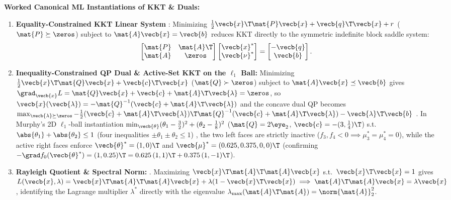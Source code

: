 \documentclass[../../../../master.tex]{subfiles}
\begin{document}
\textbf{Worked Canonical ML Instantiations of KKT \& Duals:}
\begin{enumerate}[leftmargin=1.4em]
  \item \textbf{Equality-Constrained KKT Linear System} : Minimizing $\frac{1}{2}\vecb{x}\T\mat{P}\vecb{x} + \vecb{q}\T\vecb{x} + r$ ($\mat{P} \succeq \zeros$) subject to $\mat{A}\vecb{x} = \vecb{b}$ reduces KKT directly to the symmetric indefinite block saddle system:
  \begin{equation}
    \begin{bmatrix} \mat{P} & \mat{A}\T \\ \mat{A} & \zeros \end{bmatrix}
    \begin{bmatrix} \vecb{x}^* \\ \vecb{\nu}^* \end{bmatrix}
    = \begin{bmatrix} -\vecb{q} \\ \vecb{b} \end{bmatrix}.
    \label{eq:convex:kkt_eq_qp}
  \end{equation}
  \item \textbf{Inequality-Constrained QP Dual \& Active-Set KKT on the $\ell_1$ Ball:} Minimizing $\frac{1}{2}\vecb{x}\T\mat{Q}\vecb{x} + \vecb{c}\T\vecb{x}$ ($\mat{Q} \succ \zeros$) subject to $\mat{A}\vecb{x} \preceq \vecb{b}$ gives $\grad_{\vecb{x}} L = \mat{Q}\vecb{x} + \vecb{c} + \mat{A}\T\vecb{\lambda} = \zeros$, so $\vecb{x}(\vecb{\lambda}) = -\mat{Q}^{-1}(\vecb{c} + \mat{A}\T\vecb{\lambda})$ and the concave dual QP becomes $\max_{\vecb{\lambda} \succeq \zeros} -\frac{1}{2}(\vecb{c} + \mat{A}\T\vecb{\lambda})\T\mat{Q}^{-1}(\vecb{c} + \mat{A}\T\vecb{\lambda}) - \vecb{\lambda}\T\vecb{b}$ . In Murphy's 2D $\ell_1$-ball instantiation $\min_{\vecb{\theta}} (\theta_1 - \frac{3}{2})^2 + (\theta_2 - \frac{1}{8})^2$ ($\mat{Q} = 2\eye_2$, $\vecb{c} = -(3, \frac{1}{4})\T$) s.t.\ $\abs{\theta_1}+\abs{\theta_2} \le 1$ (four inequalities $\pm\theta_1 \pm\theta_2 \le 1$) , the two left faces are strictly inactive ($f_3, f_4 < 0 \implies \mu_3^* = \mu_4^* = 0$), while the active right faces enforce $\vecb{\theta}^* = (1, 0)\T$ and $\vecb{\mu}^* = (0.625, 0.375, 0, 0)\T$ (confirming $-\grad f_0(\vecb{\theta}^*) = (1, 0.25)\T = 0.625\,(1,1)\T + 0.375\,(1,-1)\T$).
  \item \textbf{Rayleigh Quotient \& Spectral Norm:} . Maximizing $\vecb{x}\T\mat{A}\T\mat{A}\vecb{x}$ s.t.\ $\vecb{x}\T\vecb{x} = 1$ gives $L(\vecb{x}, \lambda) = \vecb{x}\T\mat{A}\T\mat{A}\vecb{x} + \lambda(1 - \vecb{x}\T\vecb{x}) \implies \mat{A}\T\mat{A}\vecb{x} = \lambda\vecb{x}$, identifying the Lagrange multiplier $\lambda^*$ directly with the eigenvalue $\lambda_{\max}(\mat{A}\T\mat{A}) = \norm{\mat{A}}_2^2$.
\end{enumerate}
\end{document}
